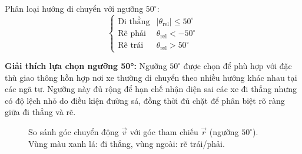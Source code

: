 Phân loại hướng di chuyển với ngưỡng \(50^\circ\):
\[
\begin{cases}
\text{Đi thẳng} & |\theta_{\text{rel}}| \le 50^\circ \\
\text{Rẽ phải} & \theta_{\text{rel}} < -50^\circ \\
\text{Rẽ trái} & \theta_{\text{rel}} > 50^\circ
\end{cases}
\]

\textbf{Giải thích lựa chọn ngưỡng 50°:} Ngưỡng $50^\circ$ được chọn để phù hợp với đặc thù giao thông hỗn hợp nơi xe thường di chuyển theo nhiều hướng khác nhau tại các ngã tư. Ngưỡng này đủ rộng để hạn chế nhận diện sai các xe đi thẳng nhưng có độ lệch nhỏ do điều kiện đường sá, đồng thời đủ chặt để phân biệt rõ ràng giữa đi thẳng và rẽ.

\begin{figure}[!htbp]
  \centering
  \caption{So sánh góc chuyển động $\vec v$ với góc tham chiếu $\vec r$ (ngưỡng $50^\circ$). Vùng màu xanh lá: đi thẳng, vùng ngoài: rẽ trái/phải.}
  \label{fig:direction_reference}
\end{figure}

